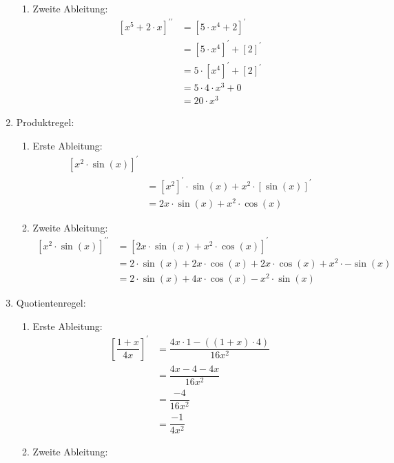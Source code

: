 \documentclass[11pt, a4paper]{report}
\begin{document}
\begin{enumerate}
\begin{enumerate}
			\item Zweite Ableitung:
				\begin{align*}
				\left[ x^{5} + 2 \cdot x \right]^{\prime\prime} &= \left[ 5\cdot x^{4} + 2 \right]^{\prime} \\
				&= \left[ 5\cdot x^{4} \right]^{\prime} + \left[ 2 \right]^{\prime} \\
				&= 5\cdot \left[ x^{4} \right]^{\prime} + \left[ 2 \right]^{\prime} \\
				&= 5\cdot 4 \cdot x^{3} + 0 \\
				&= 20 \cdot x^{3}
				\end{align*}
		\end{enumerate}
	\item Produktregel:
		\begin{enumerate}
			\item Erste Ableitung:
				\begin{align*}
				\left[ x^{2} \cdot \sin (x) \right]^{\prime} \\ 
				&= \left[ x^{2} \right]^{\prime} \cdot \sin (x) + x^{2} \cdot \left[ \sin (x) \right]^{\prime} \\
				&= 2x \cdot \sin (x) + x^{2} \cdot \cos (x) 
				\end{align*}
			\item Zweite Ableitung:
				\begin{align*}
				\left[ x^{2} \cdot \sin (x) \right]^{\prime\prime} &= \left[ 2x \cdot \sin (x) + x^{2} \cdot \cos (x) \right]^{\prime} \\
				&= 2 \cdot \sin (x) + 2x \cdot \cos (x) + 2x \cdot \cos (x) + x^{2} \cdot -\sin (x)\\
				&= 2 \cdot \sin (x) + 4x \cdot \cos (x) - x^{2} \cdot \sin (x)
				\end{align*}
		\end{enumerate}
	\item Quotientenregel:
		\begin{enumerate}
			\item Erste Ableitung:
				\begin{align*}
				\left[ \dfrac{1+x}{4x} \right]^{\prime} &=  \dfrac{4x \cdot 1 - ((1+x)\cdot 4)}{16x^{2}}\\
				&= \dfrac{4x - 4 -4x}{16x^{2}}\\
				&= \dfrac{-4}{16x^{2}}\\
				&= \dfrac{-1}{4x^{2}}
				\end{align*}
			\item Zweite Ableitung:
				\begin{align*}

\end{align*}
\end{enumerate}
\end{enumerate}
\end{document}
